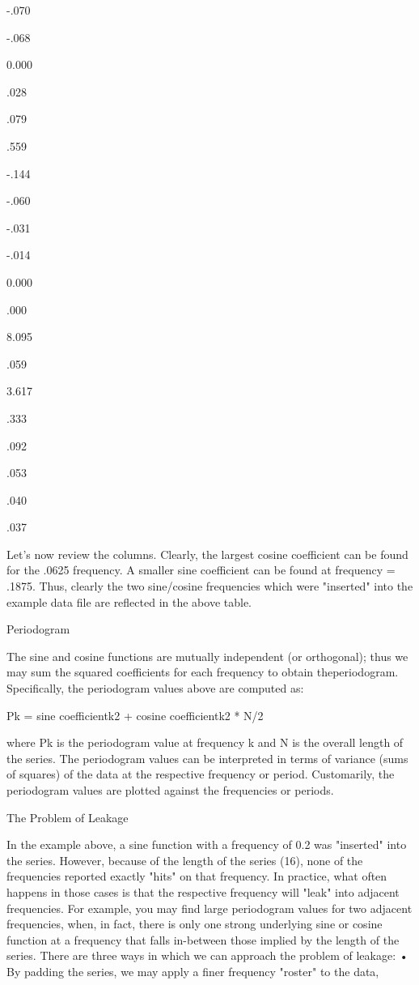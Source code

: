 -.070

-.068
 

0.000

.028

.079

.559

-.144

-.060

-.031

-.014

0.000
 

.000

8.095 

.059 

3.617 

.333 

.092 

.053 

.040 

.037
 


Let's now review the columns. Clearly, the largest cosine coefficient can be found for the .0625 frequency. A smaller sine coefficient can be found at frequency = .1875. Thus, clearly the two sine/cosine frequencies which were "inserted" into the example data file are reflected in the above table.


Periodogram

The sine and cosine functions are mutually independent (or orthogonal); thus we may sum the squared coefficients for each frequency to obtain theperiodogram. Specifically, the periodogram values above are computed as:

Pk = sine coefficientk2 + cosine coefficientk2 * N/2

where Pk is the periodogram value at frequency k and N is the overall length of the series. The periodogram values can be interpreted in terms of variance (sums of squares) of the data at the respective frequency or period. Customarily, the periodogram values are plotted against the frequencies or periods.



The Problem of Leakage

In the example above, a sine function with a frequency of 0.2 was "inserted" into the series. However, because of the length of the series (16), none of the frequencies reported exactly "hits" on that frequency. In practice, what often happens in those cases is that the respective frequency will "leak" into adjacent frequencies. For example, you may find large periodogram values for two adjacent frequencies, when, in fact, there is only one strong underlying sine or cosine function at a frequency that falls in-between those implied by the length of the series. There are three ways in which we can approach the problem of leakage:
•
By padding the series, we may apply a finer frequency "roster" to the data,

